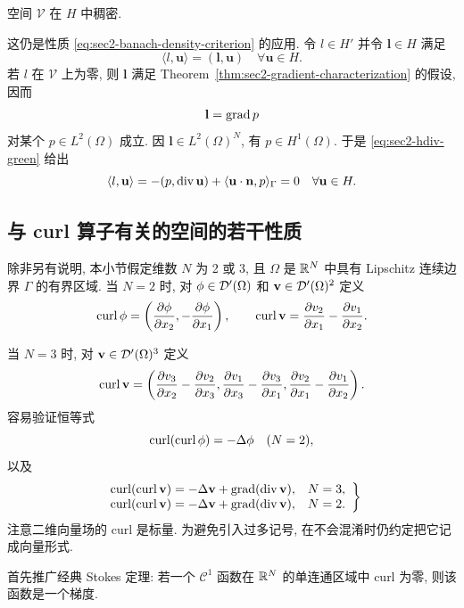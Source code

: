 \setcounter{statement}{7}
\begin{Theorem}\label{thm:sec2-test-space-dense-h}
空间 $\mathcal V$ 在 $H$ 中稠密.
\end{Theorem}
\begin{Proof}
这仍是性质 \eqref{eq:sec2-banach-density-criterion} 的应用. 令
$l\in H'$ 并令 $\mathbf l\in H$ 满足
\[
  \langle l,\mathbf u\rangle=(\mathbf l,\mathbf u)
  \quad\forall\mathbf u\in H.
\]
若 $l$ 在 $\mathcal V$ 上为零, 则 $\mathbf l$ 满足
Theorem~\ref{thm:sec2-gradient-characterization} 的假设, 因而
\[
  \mathbf l=\operatorname{grad} p
\]
对某个 $p\in L^2(\Omega)$ 成立. 因 $\mathbf l\in L^2(\Omega)^N$, 有
$p\in H^1(\Omega)$. 于是 \eqref{eq:sec2-hdiv-green} 给出
\[
  \langle l,\mathbf u\rangle
  =-(p,\operatorname{div}\mathbf u)+\langle\mathbf u\cdot\mathbf n,p\rangle_\Gamma=0
  \quad\forall\mathbf u\in H.
\]
\end{Proof}

\setcounter{subsection}{2}
\subsection{与 curl 算子有关的空间的若干性质}\label{subsec:sec2-curl-spaces}
除非另有说明, 本小节假定维数 $N$ 为 2 或 3, 且 $\Omega$ 是 $\mathbb{R}^N$ 中具有
Lipschitz 连续边界 $\Gamma$ 的有界区域. 当 $N=2$ 时, 对
$\phi\in\mathcal{D}'(\Omega)$ 和 $\mathbf v\in\mathcal{D}'(\Omega)^2$ 定义
\[
  \operatorname{curl}\phi=\left(\frac{\partial\phi}{\partial x_2},
  -\frac{\partial\phi}{\partial x_1}\right),
  \qquad
  \operatorname{curl}\mathbf v=\frac{\partial v_2}{\partial x_1}
  -\frac{\partial v_1}{\partial x_2}.
\]

当 $N=3$ 时, 对 $\mathbf v\in\mathcal{D}'(\Omega)^3$ 定义
\[
  \operatorname{curl}\mathbf v=\left(
  \frac{\partial v_3}{\partial x_2}-\frac{\partial v_2}{\partial x_3},
  \frac{\partial v_1}{\partial x_3}-\frac{\partial v_3}{\partial x_1},
  \frac{\partial v_2}{\partial x_1}-\frac{\partial v_1}{\partial x_2}
  \right).
\]
容易验证恒等式
\[
  \operatorname{curl}(\operatorname{curl}\phi)=-\Delta\phi\quad(N=2),
\]
以及
\[
  \left.\begin{array}{ll}
  \operatorname{curl}(\operatorname{curl}\mathbf v)=-\Delta\mathbf v+\operatorname{grad}(\operatorname{div}\mathbf v),&N=3,\\
  \operatorname{curl}(\operatorname{curl}\mathbf v)=-\Delta\mathbf v+\operatorname{grad}(\operatorname{div}\mathbf v),&N=2.
  \end{array}\right\}
\]
注意二维向量场的 curl 是标量. 为避免引入过多记号, 在不会混淆时仍约定把它记成向量形式.

首先推广经典 Stokes 定理: 若一个 $\mathcal C^1$ 函数在 $\mathbb{R}^N$ 的单连通区域中 curl 为零,
则该函数是一个梯度.

